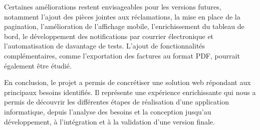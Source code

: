 Certaines améliorations restent envisageables pour les versions futures, notamment l'ajout des pièces jointes aux réclamations, la mise en place de la pagination, l'amélioration de l'affichage mobile, l'enrichissement du tableau de bord, le développement des notifications par courrier électronique et l'automatisation de davantage de tests. L'ajout de fonctionnalités complémentaires, comme l'exportation des factures au format PDF, pourrait également être étudié.

En conclusion, le projet \projectname{} a permis de concrétiser une solution web répondant aux principaux besoins identifiés. Il représente une expérience enrichissante qui nous a permis de découvrir les différentes étapes de réalisation d'une application informatique, depuis l'analyse des besoins et la conception jusqu'au développement, à l'intégration et à la validation d'une version finale.
